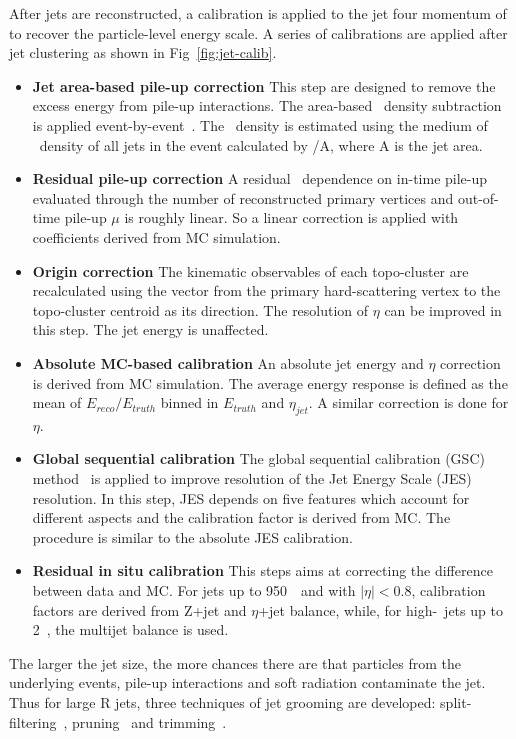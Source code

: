 \par After jets are reconstructed, a calibration is applied to the jet four momentum of to recover the particle-level energy scale.
A series of calibrations are applied after jet clustering as shown in Fig~\ref{fig:jet-calib}.

\begin{itemize}
    \item \textbf{Jet area-based pile-up correction} This step are designed to remove the excess energy from pile-up interactions. The area-based \pt~density subtraction is applied event-by-event~\cite{Cacciari:2007fd}. The \pt~density is estimated using the medium of \pt~density of all jets in the event calculated by \pt/A, where A is the jet area.
    \item \textbf{Residual pile-up correction} A residual \pt~dependence on in-time pile-up evaluated through the number of reconstructed primary vertices and out-of-time pile-up $\mu$ is roughly linear. So a linear correction is applied with coefficients derived from MC simulation. 
    \item \textbf{Origin correction} The kinematic observables of each topo-cluster are recalculated using the vector from the primary hard-scattering vertex to the topo-cluster centroid as its direction. The resolution of $\eta$ can be improved in this step. The jet energy is unaffected.
    \item \textbf{Absolute MC-based calibration} An absolute jet energy and $\eta$ correction is derived from MC simulation. The average energy response is defined as the mean of $E_{reco}/E_{truth}$ binned in $E_{truth}$ and $\eta_{jet}$. A similar correction is done for $\eta$.
    \item \textbf{Global sequential calibration} The global sequential calibration (GSC) method~\cite{Aad:2011he} is applied to improve resolution of the Jet Energy Scale (JES) resolution. In this step, JES depends on five features which account for different aspects and the calibration factor is derived from MC. The procedure is similar to the absolute JES calibration.
    \item \textbf{Residual in situ calibration} This steps aims at correcting the difference between data and MC. For jets up to 950~\GeV~and with $|\eta| < 0.8$, calibration factors are derived from Z+jet and $\eta$+jet balance, while, for high-\pt~jets up to 2~\TeV, the multijet balance is used.
\end{itemize}

\par The larger the jet size, the more chances there are that particles from the underlying events, pile-up interactions and soft radiation contaminate the jet. Thus for large R jets, three techniques of jet grooming are developed:
split-filtering~\cite{Butterworth:2008iy}, pruning~\cite{Ellis:2009me} and trimming~\cite{Krohn:2009th}. 

